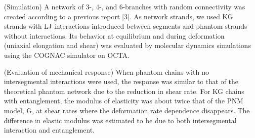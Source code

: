\documentclass[uplatex,dvipdfmx,a4paper,12pt]{article}
\begin{document}
(Simulation) A network of 3-, 4-, and 6-branches with random connectivity was created according to a previous report [3].
As network strands, we used KG strands with LJ interactions introduced between segments and phantom strands without interactions.
Its behavior at equilibrium and during deformation (uniaxial elongation and shear) was evaluated by molecular dynamics simulations using the COGNAC simulator on OCTA.




(Evaluation of mechanical response) When phantom chains with no intersegmental interactions were used, the response was similar to that of the theoretical phantom network due to the reduction in shear rate.
For KG chains with entanglement, the modulus of elasticity was about twice that of the PNM model, G, at shear rates where the deformation rate dependence disappears.
The difference in elastic modulus was estimated to be due to both intersegmental interaction and entanglement.
\end{document}

